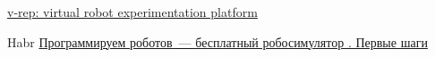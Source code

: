 \begin{thebibliography}{9}

 \href{http://www.coppeliarobotics.com/}{v-rep:
virtual robot experimentation platform}

 Habr \href{http://habrahabr.ru/company/makeitlab/blog/253357/}{Программируем роботов\ --- бесплатный робосимулятор \vrep. Первые шаги}

\end{thebibliography}
